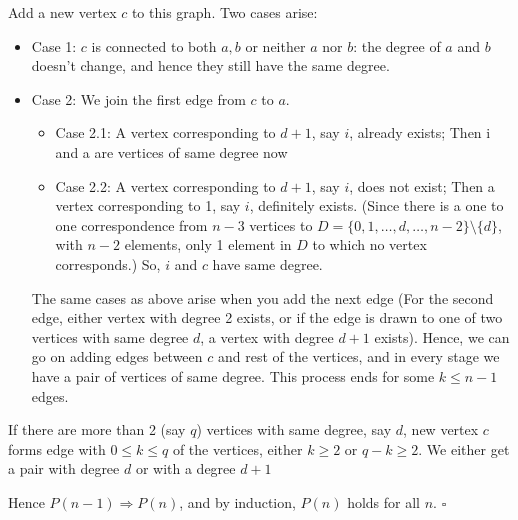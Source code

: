 \documentclass[12pt,answers]{exam}
\begin{document}
\begin{questions}
\begin{solution}
\vspace{1em}
Add a new vertex $c$ to this graph. Two cases arise:
\begin{itemize}
    \item Case 1: $c$ is connected to both $a,b$ or neither $a$ nor $b$: the degree of $a$ and $b$ doesn't change, and hence they still have the same degree.
    \item Case 2: We join the first edge from $c$ to $a$.
    \begin{itemize}
        \item Case 2.1: A vertex corresponding to $d+1$, say $i$, already exists; Then i and a are vertices of same degree now
        \item Case 2.2: A vertex corresponding to $d+1$, say $i$, does not exist; Then a vertex corresponding to 1, say $i$, definitely exists. (Since there is a one to one correspondence from $n-3$ vertices to $D = \{0,1, \ldots,d,\ldots,n-2 \} \setminus \{d\}$, with $n-2$ elements, only 1 element in $D$ to which no vertex corresponds.) So, $i$ and $c$ have same degree.
    \end{itemize}
    The same cases as above arise when you add the next edge (For the second edge, either vertex with degree 2 exists, or if the edge is drawn to one of two vertices with same degree $d$, a vertex with degree $d+1$ exists). Hence, we can go on adding edges between $c$ and rest of the vertices, and in every stage we have a pair of vertices of same degree. This process ends for some  $k \leq n-1$ edges.
\end{itemize}

If there are more than 2 (say $q$) vertices with same degree, say $d$, new vertex $c$ forms edge with $0 \leq k \leq q$ of the vertices, either $k \geq 2$ or $q-k \geq 2$. We either get a pair with degree $d$ or with a degree $d+1$

Hence $P(n-1) \Rightarrow P(n)$, and by induction, $P(n)$ holds for all $n$. \hfill $\square$
\end{solution}

\end{questions}
\end{document}
